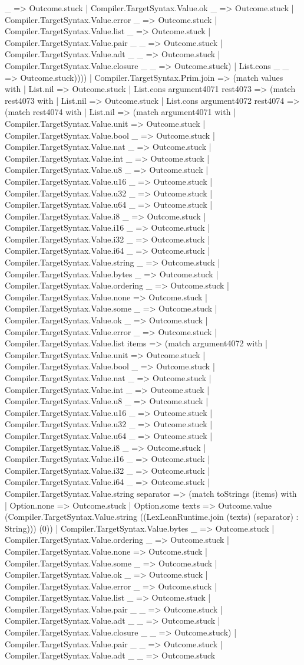 \documentclass[11pt]{article}
\begin{document}
\_ => Outcome.stuck | Compiler.TargetSyntax.Value.ok \_ => Outcome.stuck | Compiler.TargetSyntax.Value.error \_ => Outcome.stuck | Compiler.TargetSyntax.Value.list \_ => Outcome.stuck | Compiler.TargetSyntax.Value.pair \_ \_ => Outcome.stuck | Compiler.TargetSyntax.Value.adt \_ \_ => Outcome.stuck | Compiler.TargetSyntax.Value.closure \_ \_ => Outcome.stuck) | List.cons \_ \_ => Outcome.stuck)))) | Compiler.TargetSyntax.Prim.join => (match values with | List.nil => Outcome.stuck | List.cons argument4071 rest4073 => (match rest4073 with | List.nil => Outcome.stuck | List.cons argument4072 rest4074 => (match rest4074 with | List.nil => (match argument4071 with | Compiler.TargetSyntax.Value.unit => Outcome.stuck | Compiler.TargetSyntax.Value.bool \_ => Outcome.stuck | Compiler.TargetSyntax.Value.nat \_ => Outcome.stuck | Compiler.TargetSyntax.Value.int \_ => Outcome.stuck | Compiler.TargetSyntax.Value.u8 \_ => Outcome.stuck | Compiler.TargetSyntax.Value.u16 \_ => Outcome.stuck | Compiler.TargetSyntax.Value.u32 \_ => Outcome.stuck | Compiler.TargetSyntax.Value.u64 \_ => Outcome.stuck | Compiler.TargetSyntax.Value.i8 \_ => Outcome.stuck | Compiler.TargetSyntax.Value.i16 \_ => Outcome.stuck | Compiler.TargetSyntax.Value.i32 \_ => Outcome.stuck | Compiler.TargetSyntax.Value.i64 \_ => Outcome.stuck | Compiler.TargetSyntax.Value.string \_ => Outcome.stuck | Compiler.TargetSyntax.Value.bytes \_ => Outcome.stuck | Compiler.TargetSyntax.Value.ordering \_ => Outcome.stuck | Compiler.TargetSyntax.Value.none => Outcome.stuck | Compiler.TargetSyntax.Value.some \_ => Outcome.stuck | Compiler.TargetSyntax.Value.ok \_ => Outcome.stuck | Compiler.TargetSyntax.Value.error \_ => Outcome.stuck | Compiler.TargetSyntax.Value.list items => (match argument4072 with | Compiler.TargetSyntax.Value.unit => Outcome.stuck | Compiler.TargetSyntax.Value.bool \_ => Outcome.stuck | Compiler.TargetSyntax.Value.nat \_ => Outcome.stuck | Compiler.TargetSyntax.Value.int \_ => Outcome.stuck | Compiler.TargetSyntax.Value.u8 \_ => Outcome.stuck | Compiler.TargetSyntax.Value.u16 \_ => Outcome.stuck | Compiler.TargetSyntax.Value.u32 \_ => Outcome.stuck | Compiler.TargetSyntax.Value.u64 \_ => Outcome.stuck | Compiler.TargetSyntax.Value.i8 \_ => Outcome.stuck | Compiler.TargetSyntax.Value.i16 \_ => Outcome.stuck | Compiler.TargetSyntax.Value.i32 \_ => Outcome.stuck | Compiler.TargetSyntax.Value.i64 \_ => Outcome.stuck | Compiler.TargetSyntax.Value.string separator => (match toStrings (items) with | Option.none => Outcome.stuck | Option.some texts => Outcome.value (Compiler.TargetSyntax.Value.string ((LexLeanRuntime.join (texts) (separator) : String))) (0)) | Compiler.TargetSyntax.Value.bytes \_ => Outcome.stuck | Compiler.TargetSyntax.Value.ordering \_ => Outcome.stuck | Compiler.TargetSyntax.Value.none => Outcome.stuck | Compiler.TargetSyntax.Value.some \_ => Outcome.stuck | Compiler.TargetSyntax.Value.ok \_ => Outcome.stuck | Compiler.TargetSyntax.Value.error \_ => Outcome.stuck | Compiler.TargetSyntax.Value.list \_ => Outcome.stuck | Compiler.TargetSyntax.Value.pair \_ \_ => Outcome.stuck | Compiler.TargetSyntax.Value.adt \_ \_ => Outcome.stuck | Compiler.TargetSyntax.Value.closure \_ \_ => Outcome.stuck) | Compiler.TargetSyntax.Value.pair \_ \_ => Outcome.stuck | Compiler.TargetSyntax.Value.adt \_ \_ => Outcome.stuck 
\end{document}
